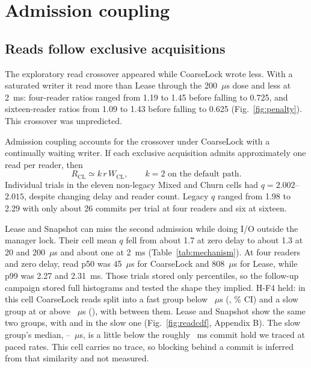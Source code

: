 \documentclass[conference]{IEEEtran}
\newif\ifwithappendix\withappendixtrue
\begin{document}
\section{Admission coupling}
\label{sec:admission}
\subsection{Reads follow exclusive acquisitions}
The exploratory read crossover appeared while CoarseLock wrote less. With a saturated writer it read more than Lease through the 200~$\mu$s dose and less at 2~ms: four-reader ratios ranged from 1.19 to 1.45 before falling to 0.725, and sixteen-reader ratios from 1.09 to 1.43 before falling to 0.625 (Fig.~\ref{fig:penalty}). This crossover was unpredicted.

Admission coupling accounts for the crossover under CoarseLock with a continually waiting writer. If each exclusive acquisition admits approximately one read per reader, then
\begin{equation}
R_{\mathrm{CL}}\simeq k\,r\,W_{\mathrm{CL}},\qquad k=2\text{ on the default path}.
\label{eq:coupling}
\end{equation}
Individual trials in the eleven non-legacy Mixed and Churn cells had $q=2.002$--$2.015$, despite changing delay and reader count. Legacy $q$ ranged from 1.98 to 2.29 with only about 26 commits per trial at four readers and six at sixteen.

Lease and Snapshot can miss the second admission while doing I/O outside the manager lock. Their cell mean $q$ fell from about 1.7 at zero delay to about 1.3 at 20 and 200~$\mu$s and about one at 2~ms (Table~\ref{tab:mechanism}). At four readers and zero delay, read p50 was 45~$\mu$s for CoarseLock and 808~$\mu$s for Lease, while p99 was 2.27 and 2.31~ms. Those trials stored only percentiles, so the follow-up campaign stored full histograms and tested the shape they implied. H-F4 held: in this cell CoarseLock reads split into a fast group below \FollowFastBound{}~$\mu$s (\FollowFastA{}, \FollowRegionCI{}\% CI) and a slow group at or above \FollowBlockedBound{}~$\mu$s (\FollowBlockedA{}), with \FollowValleyA{} between them. Lease and Snapshot show the same two groups, with \FollowBlockedPointL{} and \FollowBlockedPointS{} in the slow one\ifwithappendix{} (Fig.~\ref{fig:readcdf}, Appendix B)\fi. The slow group's median, \FollowSlowLow{}--\FollowSlowHigh{}~$\mu$s, is a little below the roughly \FollowOne{}~ms commit hold we traced at paced rates. This cell carries no trace, so blocking behind a commit is inferred from that similarity and not measured.
\end{document}
